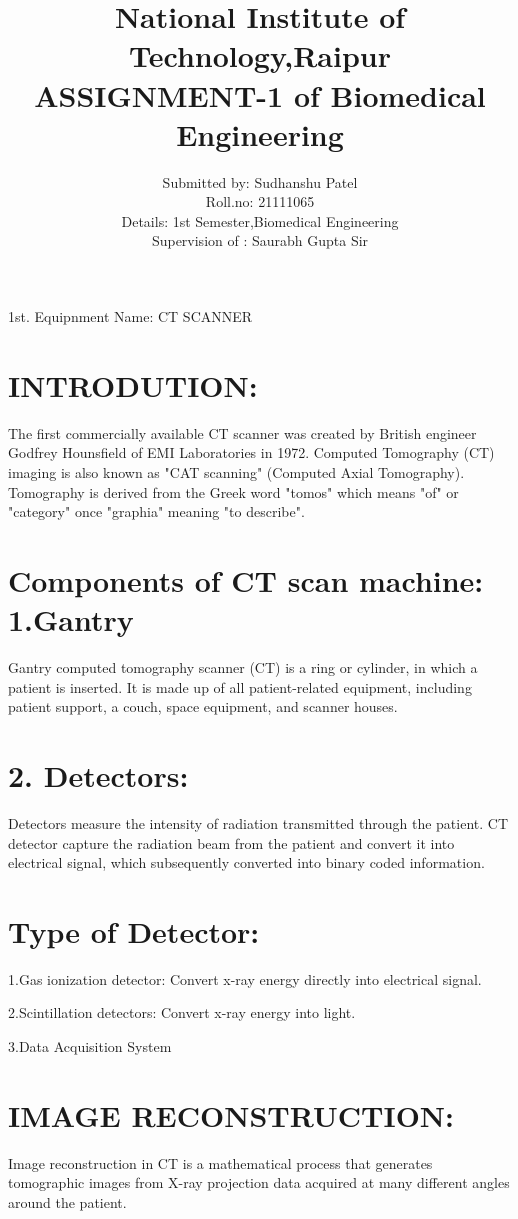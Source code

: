 \documentclass[12pt]{article}
\title{National Institute of Technology,Raipur\\ASSIGNMENT-1 of Biomedical Engineering}
\author{Submitted by: Sudhanshu Patel\\Roll.no: 21111065\\Details: 1st Semester,Biomedical Engineering\\Supervision of : Saurabh Gupta Sir}
\begin{document}
\maketitle
\clearpage
1st. Equipnment Name:  CT SCANNER

\section{INTRODUTION:}
The first commercially available CT scanner was created by British engineer Godfrey Hounsfield of EMI Laboratories in 1972. Computed Tomography (CT) imaging is also known as "CAT scanning" (Computed Axial Tomography). Tomography is derived from the Greek word "tomos" which means "of" or "category" once
"graphia" meaning "to describe".

\section{Components of CT scan machine:\\1.Gantry}
  Gantry computed tomography scanner (CT) is a ring or cylinder, in which a patient is inserted. It is made up of all patient-related equipment, including patient support, a couch, space equipment, and scanner houses.
  
  \section*{2. Detectors:}
   Detectors measure the intensity of radiation transmitted through the patient. CT detector capture the radiation beam from the patient and convert it into electrical signal, which subsequently converted into binary coded information.
   
\section{Type of Detector:}
 1.Gas ionization detector: Convert x-ray energy directly into electrical signal.
 
 
  2.Scintillation detectors: Convert x-ray energy into light. 
  
  3.Data Acquisition System 
  
  \section{IMAGE RECONSTRUCTION:}
   Image reconstruction in CT is a mathematical process that generates tomographic images from X-ray projection data acquired at many different angles around the patient.
   
\end{document}
